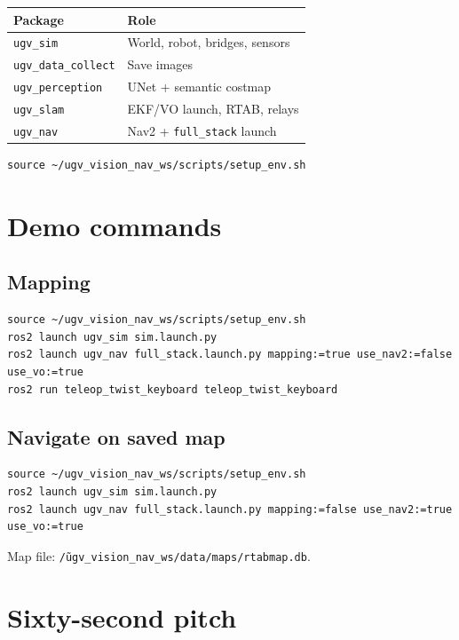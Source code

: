 \documentclass[11pt,a4paper]{article}
\begin{document}
\begin{table}[h]
\centering
\begin{tabular}{@{}ll@{}}
\toprule
Package & Role \\
\midrule
\texttt{ugv\_sim} & World, robot, bridges, sensors \\
\texttt{ugv\_data\_collect} & Save images \\
\texttt{ugv\_perception} & UNet + semantic costmap \\
\texttt{ugv\_slam} & EKF/VO launch, RTAB, relays \\
\texttt{ugv\_nav} & Nav2 + \texttt{full\_stack} launch \\
\bottomrule
\end{tabular}
\end{table}

\begin{lstlisting}
source ~/ugv_vision_nav_ws/scripts/setup_env.sh
\end{lstlisting}

\section{Demo commands}

\subsection{Mapping}
\begin{lstlisting}
source ~/ugv_vision_nav_ws/scripts/setup_env.sh
ros2 launch ugv_sim sim.launch.py
ros2 launch ugv_nav full_stack.launch.py mapping:=true use_nav2:=false use_vo:=true
ros2 run teleop_twist_keyboard teleop_twist_keyboard
\end{lstlisting}

\subsection{Navigate on saved map}
\begin{lstlisting}
source ~/ugv_vision_nav_ws/scripts/setup_env.sh
ros2 launch ugv_sim sim.launch.py
ros2 launch ugv_nav full_stack.launch.py mapping:=false use_nav2:=true use_vo:=true
\end{lstlisting}

Map file: \texttt{\~/ugv\_vision\_nav\_ws/data/maps/rtabmap.db}.

\section{Sixty-second pitch}
\end{document}
